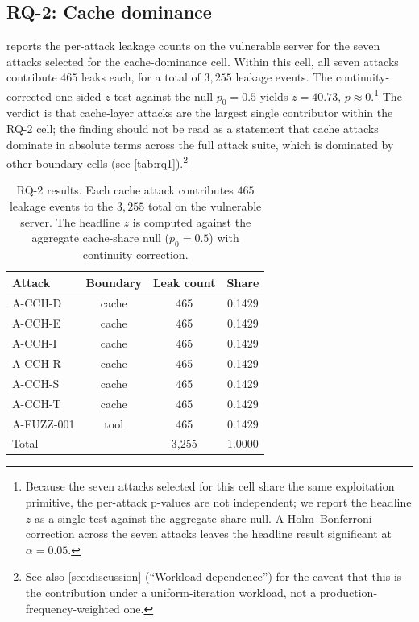 \documentclass[sigconf, anonymous, natbib=false]{acmart}
\begin{document}
\subsection{RQ-2: Cache dominance}

 reports the per-attack leakage counts on
the vulnerable server for the seven attacks selected for
the cache-dominance cell. Within this cell, all seven
attacks contribute $465$ leaks each, for a total of
$3{,}255$ leakage events. The
continuity-corrected one-sided $z$-test against the null
$p_0 = 0.5$ yields $z = 40.73$, $p \approx 0$.\footnote{
Because the seven attacks selected for this cell share
the same exploitation primitive, the per-attack p-values
are not independent; we report the headline $z$ as a
single test against the aggregate share null. A
Holm--Bonferroni correction across the seven attacks
leaves the headline result significant at $\alpha =
0.05$.} The verdict is that cache-layer attacks are the
largest single contributor within the RQ-2 cell; the
finding should not be read as a statement that cache
attacks dominate in absolute terms across the full attack
suite, which is dominated by other boundary cells (see
\cref{tab:rq1}).\footnote{See also \cref{sec:discussion}
(``Workload dependence'') for the caveat that this is
the contribution under a uniform-iteration workload, not a
production-frequency-weighted one.}

\begin{table}[t]
\caption{RQ-2 results. Each cache attack contributes
$465$ leakage events to the $3{,}255$ total on the
vulnerable server. The headline $z$ is computed against
the aggregate cache-share null ($p_0 = 0.5$) with
continuity correction.}
\label{tab:rq2}
\centering
\small
\begin{tabularx}{\linewidth}{X c c c}
\toprule
Attack & Boundary & Leak count & Share \\
\midrule
A-CCH-D     & cache & 465 & 0.1429 \\
A-CCH-E     & cache & 465 & 0.1429 \\
A-CCH-I     & cache & 465 & 0.1429 \\
A-CCH-R     & cache & 465 & 0.1429 \\
A-CCH-S     & cache & 465 & 0.1429 \\
A-CCH-T     & cache & 465 & 0.1429 \\
A-FUZZ-001  & tool  & 465 & 0.1429 \\
\midrule
Total       &       & 3{,}255 & 1.0000 \\
\bottomrule
\end{tabularx}
\end{table}
\end{document}
